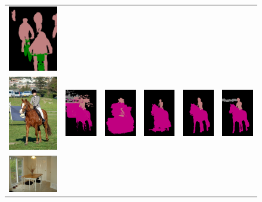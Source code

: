 \begin{figure}[!htbp]
{\begin{tabular}{c c c c c c}
    \includegraphics[height=0.13\linewidth]{fig/val_crf_vis/cocomix/2007_001630.png} \\
    \includegraphics[height=0.15\linewidth]{fig/val_crf_vis/img/2007_005331.jpg} &
    \includegraphics[height=0.15\linewidth]{fig/val_crf_vis/adaweak/2007_005331.png} &
    \includegraphics[height=0.15\linewidth]{fig/val_crf_vis/bbox/2007_005331.png} &
    \includegraphics[height=0.15\linewidth]{fig/val_crf_vis/bbox_crf/2007_005331.png} &
    \includegraphics[height=0.15\linewidth]{fig/val_crf_vis/strongweak/2007_005331.png} &
    \includegraphics[height=0.15\linewidth]{fig/val_crf_vis/cocomix/2007_005331.png} \\
\hline \hline
    \includegraphics[height=0.11\linewidth]{fig/val_crf_vis/img/2007_000830.jpg} &

\end{tabular}}
\end{figure}
